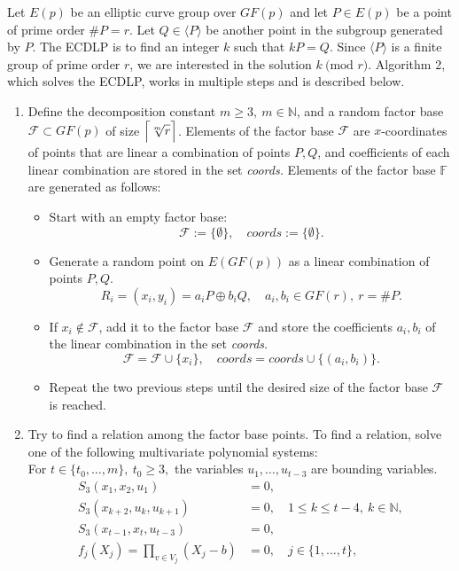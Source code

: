 \documentclass[thesis=M,english]{FITthesis}[2012/10/20]
\theoremstyle{remark}
\theoremstyle{definition}
\begin{document}
\noindent Let $E(p)$ be an elliptic curve group over $GF(p)$ and let $P \in E(p)$ be a point of prime order $\#P = r$. Let $Q \in \langle P \rangle$ be another point in the subgroup generated by $P$. The ECDLP is to find an integer $k$ such that $kP = Q.$ Since $\langle P \rangle$ is a finite group of prime order $r$, we are interested in the solution $k\ \text{(mod }r)$.  Algorithm 2, which solves the ECDLP, works in multiple steps and is described below.
\begin{enumerate}
\item Define the decomposition constant $m \geq 3,\ m \in \mathbb{N}$, and a random factor base $\mathcal{F} \subset GF(p)$ of size $\mathlarger{\Big\lceil \sqrt[m]{r} \Big\rceil}$. Elements of the factor base $\mathcal{F}$ are $x$-coordinates of points that are linear a combination of points $P,Q$, and coefficients of each linear combination are stored in the set \textit{coords.} Elements of the factor base $\mathbb{F}$ are generated as follows:
\begin{itemize}
\item Start with an empty factor base:
$$
\mathcal{F} := \{\emptyset \}, \quad \textit{coords} := \{\emptyset \}.
$$
\item Generate a random point on $E(GF(p))$ as a linear combination of points $P,Q$.
$$
R_i = (x_i, y_i) = a_iP \oplus b_iQ, \quad a_i,b_i \in GF(r),\ r = \#P.
$$
\item If $x_i \not\in \mathcal{F}$, add it to the factor base $\mathcal{F}$ and store the coefficients $a_i,b_i$ of the linear combination in the set \textit{coords}.
$$
\mathcal{F} = \mathcal{F} \cup \{x_i\},\quad \textit{coords} = \textit{coords} \cup \{(a_i, b_i)\}.
$$
\item Repeat the two previous steps until the desired size of the factor base $\mathcal{F}$ is reached.
\end{itemize}
\item Try to find a relation among the factor base points. To find a relation, solve one of the following multivariate polynomial systems: \\
For $t \in \{t_0, \ldots, m\},\ t_0 \geq 3,$ the variables $u_1,\ldots, u_{t - 3}$ are bounding variables.
\begin{align*}
S_3(x_1,x_2,u_1) &= 0, \\
S_3(x_{k+2},u_k,u_{k+1}) &= 0,\quad 1 \leq k \leq t - 4,\ k \in \mathbb{N}, \\
S_3(x_{t-1},x_{t},u_{t-3}) &= 0, \\
f_j(X_j) = \prod_{v \in V_j}(X_j - b) &= 0, \quad j \in \{1, \ldots, t\},

\end{align*}
\end{enumerate}
\end{document}
